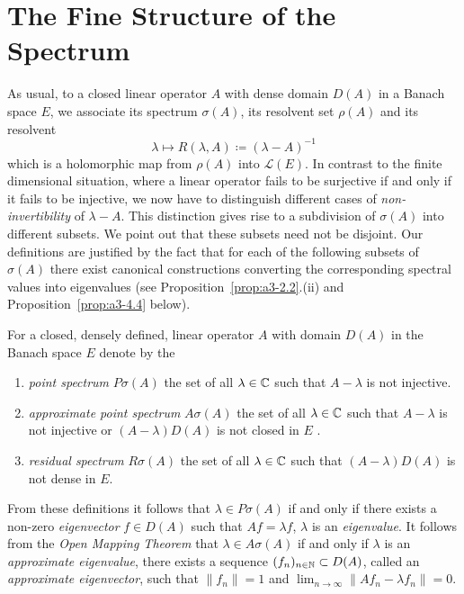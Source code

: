 \section{The Fine Structure of the Spectrum}\label{sec:a3-2}%
As usual, to a closed linear operator $A$ with dense domain $D(A)$ in a Banach space $E$, we associate its spectrum $\sigma(A)$, its resolvent set $\rho(A)$ and its resolvent
\[
    \lambda \mapsto R(\lambda,A) \coloneqq (\lambda - A)^{-1}
\]
which is a holomorphic map from $\rho(A)$ into $\mathcal{L}(E)$.
In contrast to the finite dimensional situation, where a linear operator fails to be surjective if and only if it fails to be injective, we now have to distinguish different cases of \emph{non-invertibility} of $\lambda - A$.
This distinction gives rise to a subdivision of $\sigma(A)$ into different subsets.
We point out that these subsets need not be disjoint. Our definitions are
justified by the fact that for each of the following subsets of $\sigma(A)$ there exist canonical constructions converting the corresponding spectral values into eigenvalues (see Proposition~\ref{prop:a3-2.2}.(ii) and Proposition~\ref{prop:a3-4.4} below).
\begin{definition}\label{def:a3-2.1}
For a closed, densely defined, linear operator $A$ with domain $D(A)$ in the Banach space $E$ denote by the
\begin{enumerate}[\upshape (i)]
\item 
\emph{point spectrum} $P\sigma(A)$ the set of all $\lambda \in \mathbb{C}$ such that 
$A - \lambda$ is not injective.

\item 
\emph{approximate point spectrum} $A\sigma(A)$ the set of all $\lambda \in \mathbb{C}$ such that $A - \lambda$ is not injective or $(A - \lambda)D(A)$ is not closed in $E$ .

\item 
\emph{residual spectrum} $R\sigma(A)$ the set of all $\lambda \in \mathbb{C}$ such that $(A - \lambda)D(A)$ is not dense in $E$.
\end{enumerate}
\end{definition}
From these definitions it follows that $\lambda \in P\sigma(A)$ if and only if there exists a non-zero \emph{eigenvector} $f \in D(A)$ such that $Af = \lambda f$, \ie $\lambda$ is an \emph{eigenvalue}.
It follows from the \emph{Open Mapping Theorem} that $\lambda \in A\sigma(A)$ if and only if $\lambda$ is an \emph{approximate eigenvalue}, \ie there exists a sequence $(f_{n})_{n \in \mathbb{N}} \subset D(A)$, called an\emph{ approximate eigenvector}, such that $\|f_{n}\| = 1$ and $ \lim_{n \to \infty} \|Af_{n} - \lambda f_{n}\| = 0$.

